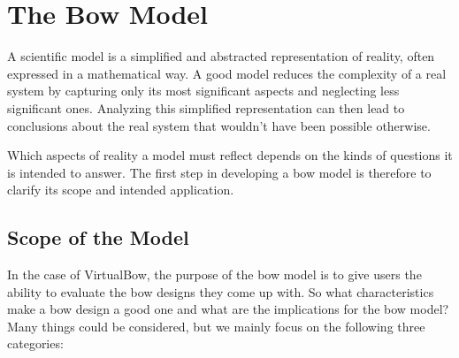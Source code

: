 
\chapter{The Bow Model}

A scientific model is a simplified and abstracted representation of reality, often expressed in a mathematical way.
A good model reduces the complexity of a real system by capturing only its most significant aspects and neglecting less significant ones.
Analyzing this simplified representation can then lead to conclusions about the real system that wouldn't have been possible otherwise.

Which aspects of reality a model must reflect depends on the kinds of questions it is intended to answer.
The first step in developing a bow model is therefore to clarify its scope and intended application.

\section{Scope of the Model}
\label{section:model-scope}

In the case of VirtualBow, the purpose of the bow model is to give users the ability to evaluate the bow designs they come up with.
So what characteristics make a bow design a good one and what are the implications for the bow model?
Many things could be considered, but we mainly focus on the following three categories:

